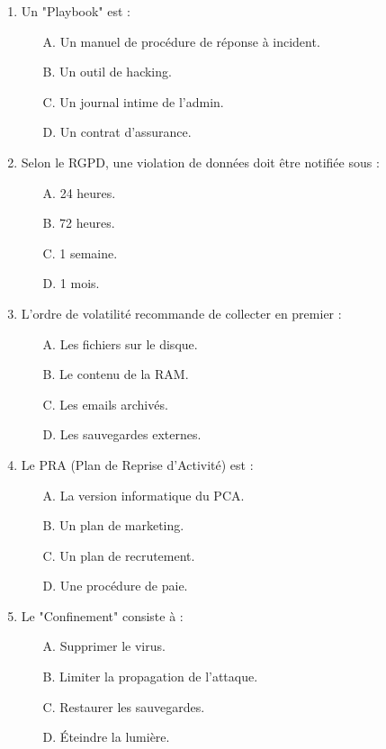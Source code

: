 \begin{enumerate}
    \item Un "Playbook" est :
    \begin{itemize}
        \item[A.] Un manuel de procédure de réponse à incident.
        \item[B.] Un outil de hacking.
        \item[C.] Un journal intime de l'admin.
        \item[D.] Un contrat d'assurance.
    \end{itemize}

    \item Selon le RGPD, une violation de données doit être notifiée sous :
    \begin{itemize}
        \item[A.] 24 heures.
        \item[B.] 72 heures.
        \item[C.] 1 semaine.
        \item[D.] 1 mois.
    \end{itemize}

    \item L'ordre de volatilité recommande de collecter en premier :
    \begin{itemize}
        \item[A.] Les fichiers sur le disque.
        \item[B.] Le contenu de la RAM.
        \item[C.] Les emails archivés.
        \item[D.] Les sauvegardes externes.
    \end{itemize}

    \item Le PRA (Plan de Reprise d'Activité) est :
    \begin{itemize}
        \item[A.] La version informatique du PCA.
        \item[B.] Un plan de marketing.
        \item[C.] Un plan de recrutement.
        \item[D.] Une procédure de paie.
    \end{itemize}

    \item Le "Confinement" consiste à :
    \begin{itemize}
        \item[A.] Supprimer le virus.
        \item[B.] Limiter la propagation de l'attaque.
        \item[C.] Restaurer les sauvegardes.
        \item[D.] Éteindre la lumière.
    \end{itemize}


\end{enumerate}
